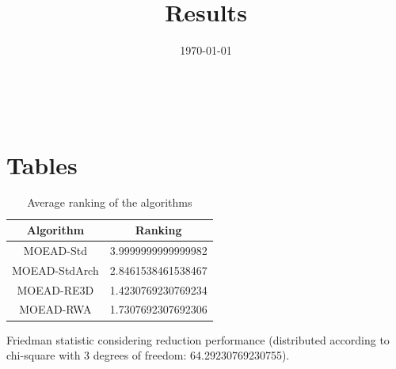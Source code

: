 \documentclass{article}
\title{Results}
\author{}
\date{\today}
\begin{document}
\oddsidemargin 0in \topmargin 0in\maketitle
\
\section{Tables}
\begin{table}[!htp]
\centering
\caption{Average ranking of the algorithms}
\begin{tabular}{c|c}
Algorithm&Ranking\\
\hline
MOEAD-Std&3.9999999999999982\\
MOEAD-StdArch&2.8461538461538467\\
MOEAD-RE3D&1.4230769230769234\\
MOEAD-RWA&1.7307692307692306\\
\end{tabular}
\end{table}


Friedman statistic considering reduction performance (distributed according to chi-square with 3 degrees of freedom: 64.29230769230755).
\end{document}
